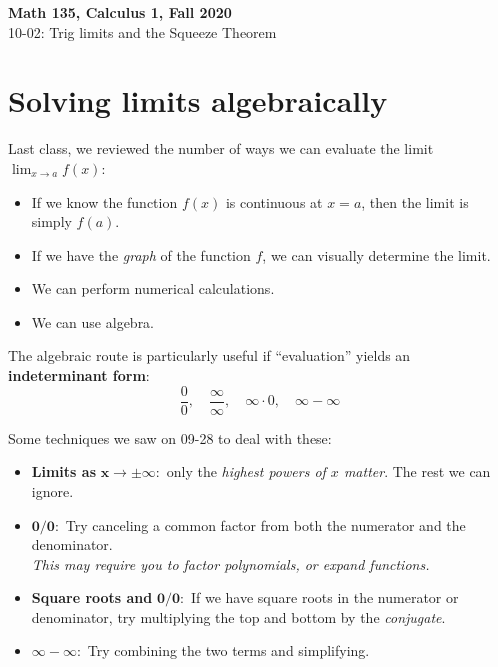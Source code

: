\documentclass[11pt,reqno,final]{amsart}
\numberwithin{figure}{section}
\theoremstyle{definition} %
\newcommand{\dlim}{\displaystyle\lim}
\begin{document}
\onehalfspacing

\begin{center}
        \textbf{\Large Math 135, Calculus 1, Fall 2020}\\[10pt]
        {\large 10-02: Trig limits and the Squeeze Theorem}
\end{center}

\thispagestyle{empty}

\renewcommand{\thesection}{\Alph{section}}

\vspace{-1pt}
\section{Solving limits algebraically}

Last class, we reviewed the number of ways we can evaluate the limit $\dlim_{x \to a}f(x)$:
\begin{itemize}
\item If we know the function $f(x)$ is continuous at $x = a$, then the limit is simply $f(a)$.
\item If we have the \textit{graph} of the function $f$, we can visually determine the limit.
\item We can perform numerical calculations.
\item We can use algebra.
\end{itemize}

The algebraic route is particularly useful if ``evaluation'' yields an \textbf{indeterminant form}:
\[
        \dfrac{0}{0}, \quad  \dfrac{\infty}{\infty}, \quad  \infty \cdot 0, \quad \infty - \infty
\]

Some techniques we saw on 09-28 to deal with these:
\begin{itemize}
\item \textbf{Limits as} $\mathbf{x \to \boldsymbol{\pm\infty \colon}}$ only the \textit{highest powers of $x$ matter}. The rest we can ignore.
\item $\mathbf{0/0:}$ Try canceling a common factor from both the numerator and the denominator.\\
        \textit{This may require you to factor polynomials, or expand functions.}
\item \textbf{Square roots and} $\mathbf{0/0:}$ If we have square roots in the numerator or denominator,
        try multiplying the top and bottom by the \textit{conjugate}.
\item $\boldsymbol{\infty - \infty \colon}$ Try combining the two terms and simplifying.
\end{itemize}
\end{document}

